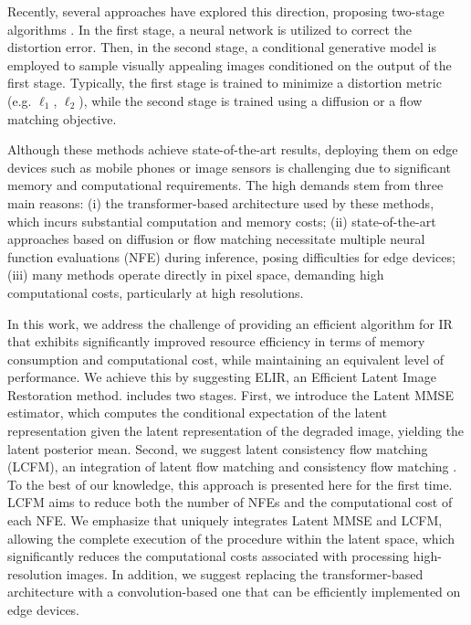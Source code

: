 Recently, several approaches have explored this direction, proposing two-stage algorithms \cite{yue2024difface,lin2023diffbir,rombach2022high,zhu2024flowie,10681246,ohayon2024posterior}. In the first stage, a neural network is utilized to correct the distortion error. Then, in the second stage, a conditional generative model is employed to sample visually appealing images conditioned on the output of the first stage. Typically, the first stage is trained to minimize a distortion metric (e.g. $\ell_1$, $\ell_2$), while the second stage is trained using a diffusion \cite{sohl2015deep, ho2020denoising} or a flow matching objective. \cite{AlbergoV23, lipman2023flow, liu2023flow} 


Although these methods achieve state-of-the-art results, deploying them on edge devices such as mobile phones or image sensors is challenging due to significant memory and computational requirements. The high demands stem from three main reasons: (i) the transformer-based architecture used by these methods, which incurs substantial computation and memory costs; (ii) state-of-the-art approaches based on diffusion or flow matching necessitate multiple neural function evaluations (NFE) during inference, posing difficulties for edge devices; (iii) many methods operate directly in pixel space, demanding high computational costs, particularly at high resolutions.

In this work, we address the challenge of providing an efficient algorithm for IR that exhibits significantly improved resource efficiency in terms of memory consumption and computational cost, while maintaining an equivalent level of performance. We achieve this by suggesting ELIR, an Efficient Latent Image Restoration method. \name includes two stages. First, we introduce the Latent MMSE estimator, which computes the conditional expectation of the latent representation given the latent representation of the degraded image, yielding the latent posterior mean. Second, we suggest latent consistency flow matching (LCFM), an integration of latent flow matching \cite{dao2023flow} and consistency flow matching \cite{yang2024consistencyfm}. To the best of our knowledge, this approach is presented here for the first time. LCFM aims to reduce both the number of NFEs and the computational cost of each NFE. We emphasize that \name uniquely integrates Latent MMSE and LCFM, allowing the complete execution of the procedure within the latent space, which significantly reduces the computational costs associated with processing high-resolution images. In addition, we suggest replacing the transformer-based architecture with a convolution-based one that can be efficiently implemented on edge devices. 

